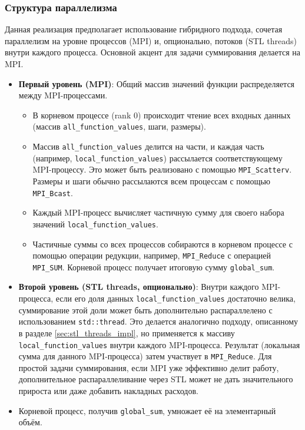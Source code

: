 \documentclass[12pt]{article}
\begin{document}
\subsubsection*{Структура параллелизма}
Данная реализация предполагает использование гибридного подхода, сочетая параллелизм на уровне процессов (MPI) и, опционально, потоков (STL threads) внутри каждого процесса. Основной акцент для задачи суммирования делается на MPI.
\begin{itemize}
  \item \textbf{Первый уровень (MPI)}: Общий массив значений функции распределяется между MPI-процессами.
    \begin{itemize}
        \item В корневом процессе (rank 0) происходит чтение всех входных данных (массив \texttt{all\_function\_values}, шаги, размеры).
        \item Массив \texttt{all\_function\_values} делится на части, и каждая часть (например, \texttt{local\_function\_values}) рассылается соответствующему MPI-процессу. Это может быть реализовано с помощью \texttt{MPI\_Scatterv}. Размеры и шаги обычно рассылаются всем процессам с помощью \texttt{MPI\_Bcast}.
        \item Каждый MPI-процесс вычисляет частичную сумму для своего набора значений \texttt{local\_function\_values}.
        \item Частичные суммы со всех процессов собираются в корневом процессе с помощью операции редукции, например, \texttt{MPI\_Reduce} с операцией \texttt{MPI\_SUM}. Корневой процесс получает итоговую сумму \texttt{global\_sum}.
    \end{itemize}
  \item \textbf{Второй уровень (STL threads, опционально)}: Внутри каждого MPI-процесса, если его доля данных \texttt{local\_function\_values} достаточно велика, суммирование этой доли может быть дополнительно распараллелено с использованием \texttt{std::thread}. Это делается аналогично подходу, описанному в разделе \ref{sec:stl_threads_impl}, но применяется к массиву \texttt{local\_function\_values} внутри каждого MPI-процесса. Результат (локальная сумма для данного MPI-процесса) затем участвует в \texttt{MPI\_Reduce}. Для простой задачи суммирования, если MPI уже эффективно делит работу, дополнительное распараллеливание через STL может не дать значительного прироста или даже добавить накладных расходов.
  \item Корневой процесс, получив \texttt{global\_sum}, умножает её на элементарный объём.
\end{itemize}
\end{document}
